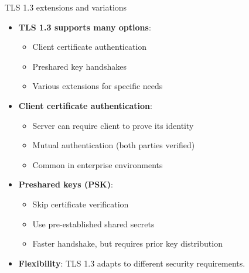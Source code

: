 \documentclass[aspectratio=169, lualatex, handout]{beamer}
\begin{document}
\begin{frame}{TLS 1.3 extensions and variations}
	\begin{itemize}
		\item \textbf{TLS 1.3 supports many options}:
		      \begin{itemize}
			      \item Client certificate authentication
			      \item Preshared key handshakes
			      \item Various extensions for specific needs
		      \end{itemize}
		\item \textbf{Client certificate authentication}:
		      \begin{itemize}
			      \item Server can require client to prove its identity
			      \item Mutual authentication (both parties verified)
			      \item Common in enterprise environments
		      \end{itemize}
		\item \textbf{Preshared keys (PSK)}:
		      \begin{itemize}
			      \item Skip certificate verification
			      \item Use pre-established shared secrets
			      \item Faster handshake, but requires prior key distribution
		      \end{itemize}
		\item \textbf{Flexibility}: TLS 1.3 adapts to different security requirements.
	\end{itemize}
\end{frame}
\end{document}
